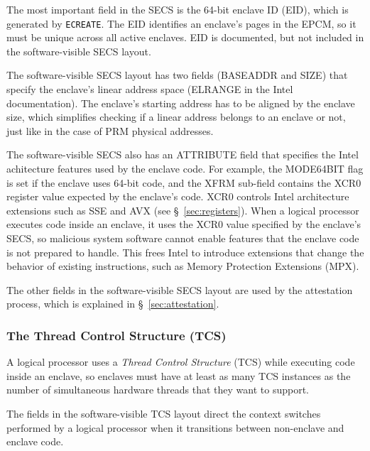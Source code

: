 The most important field in the SECS is the 64-bit enclave ID (EID), which is
generated by \texttt{ECREATE}. The EID identifies an enclave's pages in the
EPCM, so it must be unique across all active enclaves. EID is documented, but
not included in the software-visible SECS layout.

The software-visible SECS layout has two fields (BASEADDR and SIZE) that
specify the enclave's linear address space (ELRANGE in the Intel
documentation). The enclave's starting address has to be aligned by the enclave
size, which simplifies checking if a linear address belongs to an enclave or
not, just like in the case of PRM physical addresses.


The software-visible SECS also has an ATTRIBUTE field that specifies the Intel
achitecture features used by the enclave code. For example, the MODE64BIT flag
is set if the enclave uses 64-bit code, and the XFRM sub-field contains the
XCR0 register value expected by the enclave's code. XCR0 controls Intel
architecture extensions such as SSE and AVX (see \S~\ref{sec:registers}). When
a logical processor executes code inside an enclave, it uses the XCR0 value
specified by the enclave's SECS, so malicious system software cannot enable
features that the enclave code is not prepared to handle. This frees Intel to
introduce extensions that change the behavior of existing instructions, such as
Memory Protection Extensions (MPX).

The other fields in the software-visible SECS layout are used by the
attestation process, which is explained in \S~\ref{sec:attestation}.

\subsubsection{The Thread Control Structure (TCS)}
\label{sec:tcs}


A logical processor uses a \textit{Thread Control Structure} (TCS) while
executing code inside an enclave, so enclaves must have at least as many TCS
instances as the number of simultaneous hardware threads that they want to
support.

The fields in the software-visible TCS layout direct the context switches
performed by a logical processor when it transitions between non-enclave and
enclave code.


